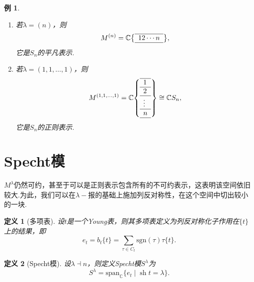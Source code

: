 \documentclass{sjtureport}
\newtheorem{definition}{定义}[chapter]
\newtheorem{example}{例}[chapter]
\DeclareMathOperator{\sh}{sh}
\begin{document}
\begin{example}
    \begin{enumerate}[label=(\arabic*)]
        \item 若$\lambda=(n)$，则
        \begin{equation*}
            M^{(n)}=\mathbb{C}\qty{\begin{array}{l}
            \hline
            12\cdots n\\
            \hline\end{array}},
        \end{equation*}
        它是$S_n$的平凡表示.
        \item 若$\lambda=(1,1,\ldots,1)$，则
        \begin{equation*}
            M^{(1,1,\ldots,1)}=\mathbb{C}\qty{\begin{array}{l}
            \hline
            1\\
            \hline
            2\\
            \hline
            \vdots\\
            \hline
            n\\
            \hline\end{array}}\cong \mathbb{C}{S_n},
        \end{equation*}
        它是$S_n$的正则表示.
    \end{enumerate}
        
\end{example}


\section{Specht模}
$M^\lambda$仍然可约，甚至于可以是正则表示包含所有的不可约表示，这表明该空间依旧较大.为此，我们可以在$\lambda-\!$报的基础上施加列反对称性，在这个空间中切出较小的一块.

\begin{definition}[多项表]
    设$t$是一个Young表，则其多项表定义为列反对称化子作用在$\{t\}$上的结果，即
    \begin{equation*}
    e_t = b_t \{t\} = \sum_{\tau \in C_t} \mathrm{sgn}(\tau)\tau \{t\}.
    \end{equation*}    
\end{definition}

\begin{definition}[Specht模]
    设$\lambda\dashv n$，则定义Specht模$S^\lambda$为
    \begin{equation*}
        S^\lambda = \mathrm{span}_\mathbb{C}\{e_t \mid \sh t = \lambda\}.
    \end{equation*}
\end{definition}
\end{document}
